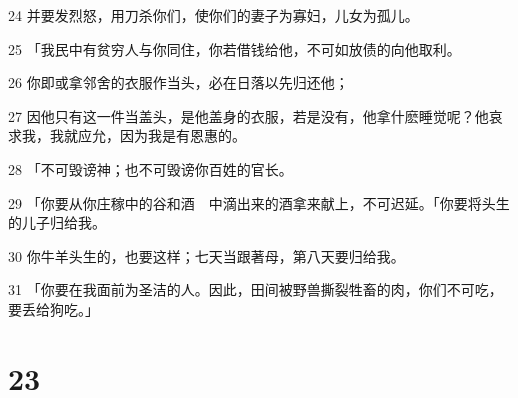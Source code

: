 \par 24 并要发烈怒，用刀杀你们，使你们的妻子为寡妇，儿女为孤儿。
\par 25 「我民中有贫穷人与你同住，你若借钱给他，不可如放债的向他取利。
\par 26 你即或拿邻舍的衣服作当头，必在日落以先归还他；
\par 27 因他只有这一件当盖头，是他盖身的衣服，若是没有，他拿什麽睡觉呢？他哀求我，我就应允，因为我是有恩惠的。
\par 28 「不可毁谤神；也不可毁谤你百姓的官长。
\par 29 「你要从你庄稼中的谷和酒　中滴出来的酒拿来献上，不可迟延。「你要将头生的儿子归给我。
\par 30 你牛羊头生的，也要这样；七天当跟著母，第八天要归给我。
\par 31 「你要在我面前为圣洁的人。因此，田间被野兽撕裂牲畜的肉，你们不可吃，要丢给狗吃。」

\chapter{23}

